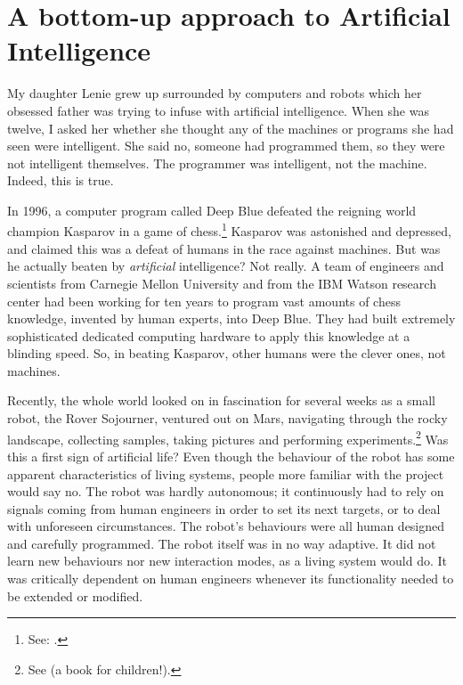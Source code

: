 \section{A bottom-up approach to Artificial Intelligence}

 My daughter Lenie grew up surrounded by computers and 
robots which her obsessed father was trying to infuse
with artificial intelligence. When she was twelve, I asked
her whether she thought any of the machines or 
programs she had seen were intelligent. 
She said no, someone had programmed them, so they were
not intelligent themselves. The programmer was 
intelligent, not the machine. Indeed, this is true. 

In 1996, a computer program called Deep Blue
defeated the reigning world champion Kasparov in a game of 
chess.\footnote{See: \cite{Newborn:1996}.}
Kasparov was astonished
and depressed, and claimed this was a defeat of humans in 
the 
race against machines. But was he actually beaten by {\itshape artificial}
intelligence? Not really. A team of engineers and scientists
from Carnegie Mellon University and from the IBM Watson 
research center had been working for ten years to program 
vast amounts of chess knowledge, invented by
human experts, into Deep Blue. They had built extremely 
sophisticated dedicated computing hardware to
apply this knowledge at a blinding speed. So, in beating Kasparov, 
other humans were the clever ones, not machines. 

Recently, the whole world looked on in fascination
for several weeks as a small robot, the Rover Sojourner, ventured
out on Mars, navigating through the rocky landscape, collecting
samples, taking pictures and performing 
experiments.\footnote{
See \cite{Wunsch:1998} (a book for children!).}
Was this a first sign of artificial life? Even though the 
behaviour of the robot has some apparent characteristics
of living systems, people more
familiar with the project would say no. 
The robot was hardly autonomous; it continuously had to rely
on signals coming from human engineers in order to set
its next targets, or to deal with unforeseen circumstances. 
The robot's behaviours were
all human designed and carefully programmed. The robot 
itself was in no way adaptive. It did not learn new behaviours
nor new interaction modes, as a living system would do.
It was critically dependent on human engineers whenever its
functionality needed to be extended or modified. 

